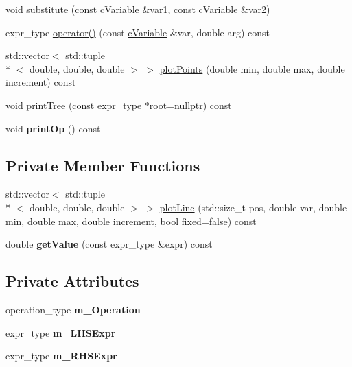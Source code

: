\begin{DoxyCompactItemize}
\item 
void \hyperlink{classcFuncExpr_a6651f4e191ec2dbbdfd053ef7a06fa15}{substitute} (const \hyperlink{classcVariable}{c\-Variable} \&var1, const \hyperlink{classcVariable}{c\-Variable} \&var2)
\item 
expr\-\_\-type \hyperlink{classcFuncExpr_a94a97933bf6508590d2a5bdd5d953632}{operator()} (const \hyperlink{classcVariable}{c\-Variable} \&var, double arg) const 
\item 
std\-::vector$<$ std\-::tuple\\*
$<$ double, double, double $>$ $>$ \hyperlink{classcFuncExpr_a7f827c4d0d44e4a890129317d0568dfd}{plot\-Points} (double min, double max, double increment) const 
\item 
void \hyperlink{classcFuncExpr_a210c6958768883486f404c21bed9b53b}{print\-Tree} (const expr\-\_\-type $\ast$root=nullptr) const 
\item 
\hypertarget{classcFuncExpr_ac68cde87cc0284d6f750a9b0d7f220a9}{void {\bfseries print\-Op} () const }\label{classcFuncExpr_ac68cde87cc0284d6f750a9b0d7f220a9}

\end{DoxyCompactItemize}
\subsection*{Private Member Functions}
\begin{DoxyCompactItemize}
\item 
std\-::vector$<$ std\-::tuple\\*
$<$ double, double, double $>$ $>$ \hyperlink{classcFuncExpr_a80a2b818fdf41356c390d7d5acfae2b9}{plot\-Line} (std\-::size\-\_\-t pos, double var, double min, double max, double increment, bool fixed=false) const 
\item 
\hypertarget{classcFuncExpr_a75cfcc14129d9fe761796af5c99a2c0c}{double {\bfseries get\-Value} (const expr\-\_\-type \&expr) const }\label{classcFuncExpr_a75cfcc14129d9fe761796af5c99a2c0c}

\end{DoxyCompactItemize}
\subsection*{Private Attributes}
\begin{DoxyCompactItemize}
\item 
\hypertarget{classcFuncExpr_a198c337af0292c7fafef007801cfee3a}{operation\-\_\-type {\bfseries m\-\_\-\-Operation}}\label{classcFuncExpr_a198c337af0292c7fafef007801cfee3a}

\item 
\hypertarget{classcFuncExpr_a678206897a682b72a34a6e1176e47592}{expr\-\_\-type {\bfseries m\-\_\-\-L\-H\-S\-Expr}}\label{classcFuncExpr_a678206897a682b72a34a6e1176e47592}

\item 
\hypertarget{classcFuncExpr_ae4acff93f9a21a7b5c472b9a0202acd5}{expr\-\_\-type {\bfseries m\-\_\-\-R\-H\-S\-Expr}}\label{classcFuncExpr_ae4acff93f9a21a7b5c472b9a0202acd5}

\end{DoxyCompactItemize}
